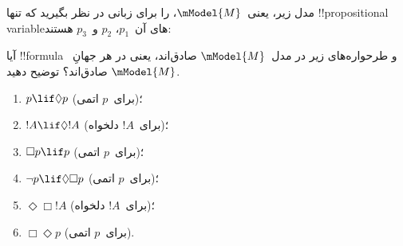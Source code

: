 \documentclass[../../../include/open-logic-section]{subfiles}
\begin{document}
\begin{prob}
  مدل زیر، یعنی~$\mModel{M}$، را برای زبانی در نظر بگیرید که تنها
  !!{propositional variable}های آن~$p_1$، $p_2$ و~$p_3$ هستند:
  \begin{center}
  \end{center}
  آیا !!{formula} و طرحواره‌های زیر در مدل~$\mModel{M}$ صادق‌اند، یعنی
  در هر جهانِ~$\mModel{M}$ صادق‌اند؟ توضیح دهید.
  \begin{enumerate}
  \item $p\lif \Diamond p$ (برای~$p$ اتمی)؛
  \item $!A\lif \Diamond !A$ (برای~$!A$ دلخواه)؛
  \item $\Box p \lif p$ (برای~$p$ اتمی)؛
  \item $\lnot p \lif \Diamond \Box p$ (برای~$p$ اتمی)؛
  \item $\Diamond \Box !A$ (برای~$!A$ دلخواه)؛
  \item $\Box \Diamond p$ (برای~$p$ اتمی).
  \end{enumerate}
\end{prob}
\end{document}
